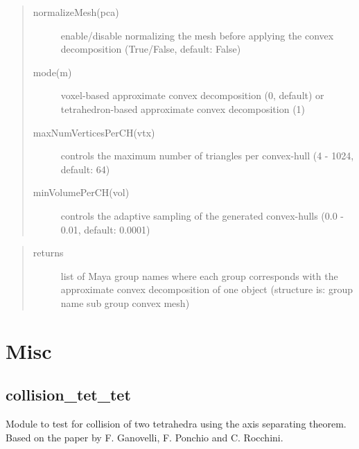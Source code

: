 \documentclass[letterpaper,10pt,english]{sphinxmanual}
\begin{document}
\begin{description}
\begin{quote}
\begin{description}
\item[{normalizeMesh(pca)}] \leavevmode
enable/disable normalizing the mesh before applying the convex decomposition (True/False, default: False)

\item[{mode(m)}] \leavevmode
voxel-based approximate convex decomposition (0, default) or tetrahedron-based approximate convex decomposition (1)

\item[{maxNumVerticesPerCH(vtx)}] \leavevmode
controls the maximum number of triangles per convex-hull (4 - 1024, default: 64)

\item[{minVolumePerCH(vol)}] \leavevmode
controls the adaptive sampling of the generated convex-hulls (0.0 - 0.01, default: 0.0001)

\end{description}\end{quote}

\end{description}
\begin{quote}\begin{description}
\item[{returns}] \leavevmode
list of Maya group names where each group corresponds with the approximate convex decomposition of one object (structure is: group name \textbar{} sub group \textbar{} convex mesh)

\end{description}\end{quote}


\chapter{Misc}
\label{\detokenize{index:sec-misc}}\label{\detokenize{index:misc}}

\section{collision\_tet\_tet}
\label{\detokenize{pk_src.collision_tet_tet:collision-tet-tet}}\label{\detokenize{pk_src.collision_tet_tet::doc}}\label{\detokenize{pk_src.collision_tet_tet:id1}}
{\hyperref[\detokenize{index:sec-misc}]{}}
\label{\detokenize{pk_src.collision_tet_tet:module-pk_src.collision_tet_tet}}
Module to test for collision of two tetrahedra using the axis separating theorem.
Based on the paper  by F. Ganovelli, F. Ponchio and C. Rocchini.
\end{document}
